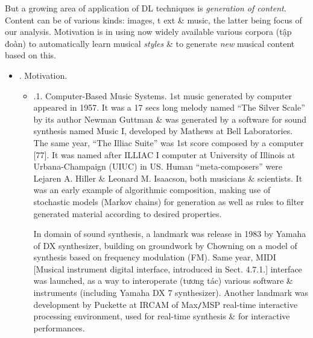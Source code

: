 \documentclass{article}
\begin{document}
\begin{itemize}
	But a growing area of application of DL techniques is {\it generation of content}. Content can be of various kinds: images, t ext \& music, the latter being focus of our analysis. Motivation is in using now widely available various corpora (tập đoàn) to automatically learn musical {\it styles} \& to generate {\it new} musical content based on this.
	\begin{itemize}
		\item {. Motivation.}
		\begin{itemize}
			\item {.1. Computer-Based Music Systems.} 1st music generated by computer appeared in 1957. It was a 17 secs long melody named ``The Silver Scale'' by its author {\sc Newman Guttman} \& was generated by a software for sound synthesis named Music I, developed by {\sc Mathews} at Bell Laboratories. The same year, ``The Illiac Suite'' was 1st score composed by a computer [77]. It was named after ILLIAC I computer at University of Illinois at Urbana-Champaign (UIUC) in US. Human ``meta-composers'' were {\sc Lejaren A. Hiller \& Leonard M. Isaacson}, both musicians \& scientists. It was an early example of algorithmic composition, making use of stochastic models (Markov chains) for generation as well as rules to filter generated material according to desired properties.
			
			In domain of sound synthesis, a landmark was release in 1983 by Yamaha of DX synthesizer, building on groundwork by {\sc Chowning} on a model of synthesis based on frequency modulation (FM). Same year, MIDI [Musical instrument digital interface, introduced in Sect. 4.7.1.] interface was launched, as a way to interoperate (tương tác) various software \& instruments (including Yamaha DX 7 synthesizer). Another landmark was development by {\sc Puckette} at IRCAM of Max{\tt/}MSP real-time interactive processing environment, used for real-time synthesis \& for interactive performances.
			

\end{itemize}
\end{itemize}
\end{itemize}
\end{document}
